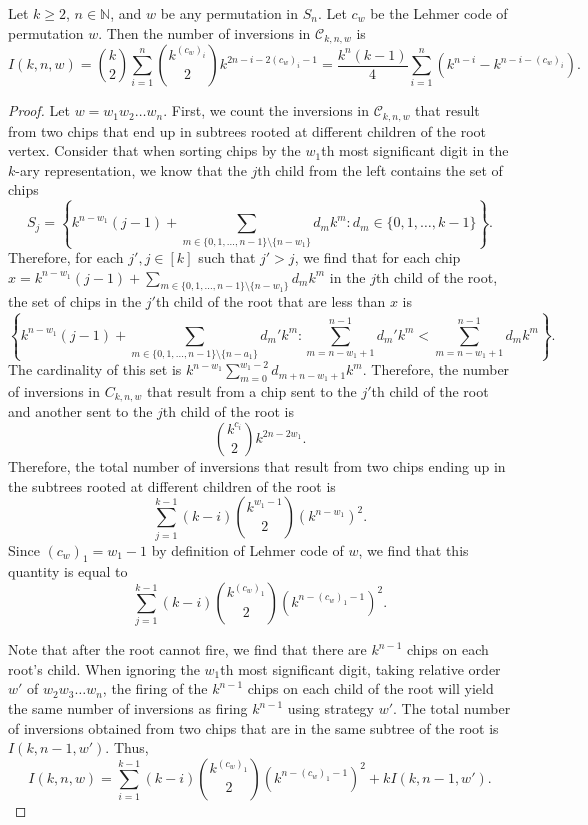 \documentclass[10pt,a4paper]{amsart}
\begin{document}
\begin{theorem}\label{thm:Lehmer}
Let $k \geq 2$, $n \in \mathbb{N}$, and $w$ be any permutation in $S_n$. Let $c_w$ be the Lehmer code of permutation $w$. Then the number of inversions in $\mathcal{C}_{k, n, w}$ is
\[I(k, n, w) = \binom{k}{2} \sum_{i=1}^{n}\binom{k^{(c_w)_{i}}}{2}k^{2n-i-2(c_w)_i-1} = \frac{k^n(k-1)}{4}\sum_{i=1}^n(k^{n-i} -k^{n-i-(c_w)_i}).\]
\end{theorem}

\begin{proof}
Let $w = w_1w_2\dots w_n$. First, we count the inversions in $\mathcal{C}_{k, n, w}$ that result from two chips that end up in subtrees rooted at different children of the root vertex. Consider that when sorting chips by the $w_1$th most significant digit in the $k$-ary representation, we know that the $j$th child from the left contains the set of chips
$$S_j = \left\{k^{n-w_1}(j-1) + \sum_{m \in \{0,1, \dots, n-1\}\setminus \{n-w_1\}}d_m k^m: d_m \in \{0,1, \dots, k-1\} \right\}.$$
Therefore, for each $j', j \in [k]$ such that $j' > j$, we find that for each chip $x = k^{n-w_1}(j-1)+\sum_{m \in \{0, 1, \dots, n-1\}\setminus \{n-w_1\}}d_mk^m$ in the $j$th child of the root, the set of chips in the $j'$th child of the root that are less than $x$ is
$$\left\{k^{n-w_1}(j-1) + \sum_{m \in \{0,1, \dots, n-1\}\setminus \{n-a_1\} }d_m'k^m: \sum_{m = n-w_1+1}^{n-1}d_m'k^{m} < \sum_{m = n-w_1+1}^{n-1} d_mk^{m} \right\}.$$ The cardinality of this set is $k^{n-w_1}\sum_{m=0}^{w_1-2}d_{m+n-w_1+1}k^m $. Therefore, the number of inversions in $C_{k, n, w}$ that result from a chip sent to the $j'$th child of the root and another sent to the $j$th child of the root is
$$\binom{k^{c_i}}{2}k^{2n-2w_1}.$$
Therefore, the total number of inversions that result from two chips ending up in the subtrees rooted at different children of the root is
$$\sum_{j=1}^{k-1}(k-i)\binom{k^{w_1-1}}{2} (k^{n-w_1})^2.$$
Since $(c_w)_1 = w_1-1$ by definition of Lehmer code of $w$, we find that this quantity is equal to
$$\sum_{j=1}^{k-1}(k-i)\binom{k^{(c_w)_1} }{2} (k^{n-(c_w)_1-1})^2.$$

Note that after the root cannot fire, we find that there are $k^{n-1}$ chips on each root's child. When ignoring the $w_1$th most significant digit, taking relative order $w'$ of $w_2w_3\dots w_n$, the firing of the $k^{n-1}$ chips on each child of the root will yield the same number of inversions as firing $k^{n-1}$ using strategy $w'$. The total number of inversions obtained from two chips that are in the same subtree of the root is $I(k, n-1, w')$. Thus,
\begin{equation}\label{eq:RecursiveRelation}
I(k, n, w) = \sum_{i=1}^{k-1}(k-i)\binom{k^{(c_w)_1} }{ 2} (k^{n-(c_w)_1-1})^2 + k I(k, n-1, w').
\end{equation}


\end{proof}
\end{document}
